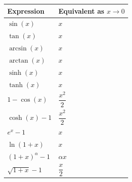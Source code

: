 \begin{center}
\renewcommand{\arraystretch}{1.3}
\begin{tabular}{@{}ll@{}}
\toprule
\textbf{Expression} & \textbf{Equivalent as } $x \to 0$ \\
\midrule
$\sin(x)$ & $x$ \\
$\tan(x)$ & $x$ \\
$\arcsin(x)$ & $x$ \\
$\arctan(x)$ & $x$ \\
$\sinh(x)$ & $x$ \\
$\tanh(x)$ & $x$ \\
$1 - \cos(x)$ & $\dfrac{x^2}{2}$ \\
$\cosh(x) - 1$ & $\dfrac{x^2}{2}$ \\
$e^x - 1$ & $x$ \\
$\ln(1 + x)$ & $x$ \\
$(1 + x)^\alpha - 1$ & $\alpha x$ \\
$\sqrt{1 + x} - 1$ & $\dfrac{x}{2}$ \\
\bottomrule
\end{tabular}
\end{center}
